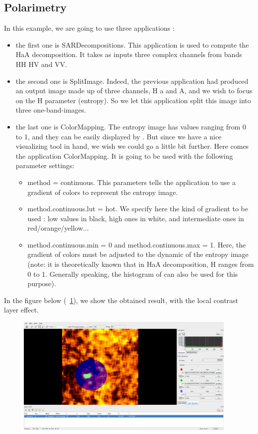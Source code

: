 \subsection{Polarimetry}\label{ssec:monpolar}
In this example, we are going to use three applications : 
\begin{itemize}
\item the first one is SARDecompositions. This application is used to compute the HaA decomposition. It takes as inputs three complex channels from bands HH HV and VV.
\item the second one is SplitImage. Indeed, the previous application had produced an output image made up of three channels, H a and A, and we wish to focus on the H parameter (entropy). 
So we let this application split this image into three one-band-images.
\item the last one is ColorMapping. The entropy image has values ranging from 0 to 1, and they can be easily displayed by \mont. But since we have a nice visualizing tool in hand, we wish we could go a little bit further.
Here comes the application ColorMapping. It is going to be used with the following parameter settings:
\begin{itemize}
\item method = continuous. This parameters tells the application to use a gradient of colors to represent the entropy image.
\item method.continuous.lut = hot. We specify here the kind of gradient to be used : low values in black, high ones in white, and intermediate ones in red/orange/yellow...
\item method.continuous.min = 0 and method.continuous.max = 1. Here, the gradient of colors must be adjusted to the dynamic of the entropy image (note: it is theoretically known that in HaA decomposition, H ranges from 0 to 1. Generally speaking, the histogram of \mont can also be used for this purpose).
\end{itemize}
\end{itemize}

In the figure below (~\ref{fig:pol1}), we show the obtained result, with the local contrast layer effect.

\begin{figure}[!h] 
  \center
  \includegraphics[width=0.95\textwidth]{../Art/MonteverdiImages/pol1.png}
  \label{fig:pol1}
\end{figure}


